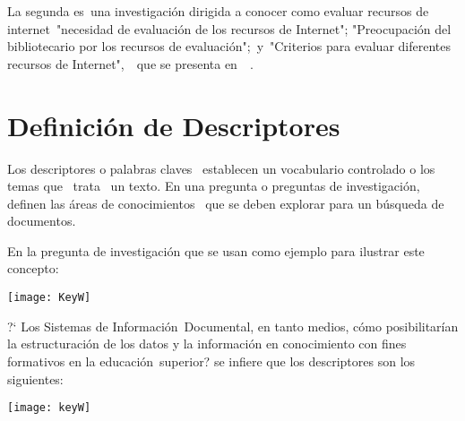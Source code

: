 La segunda es una investigación dirigida a conocer  como evaluar recursos de internet "necesidad de evaluación de los recursos de Internet"; "Preocupación del bibliotecario por los recursos de evaluación"; y "Criterios para evaluar diferentes recursos de Internet",  que se presenta en  .

\section{ Definición de Descriptores}


  Los descriptores o palabras claves  establecen un vocabulario controlado o los temas que  trata  un texto. En una pregunta o preguntas de investigación, definen las áreas de conocimientos  que se deben explorar para un búsqueda de documentos.
  
  En la pregunta de investigación que se usan como ejemplo para ilustrar este concepto: 
  
  \begin{marginfigure}[-3.3cm]%
  	\texttt{[image: KeyW]}
  \end{marginfigure}
  
  
   ?` Los Sistemas de Información Documental, en tanto medios, cómo posibilitarían la estructuración de los datos y la información en conocimiento con fines formativos en la educación superior?    
  se infiere que los descriptores son los siguientes: 
  
  \begin{marginfigure}[-3cm]%
  	\texttt{[image: keyW]}
  \end{marginfigure}
  
  
